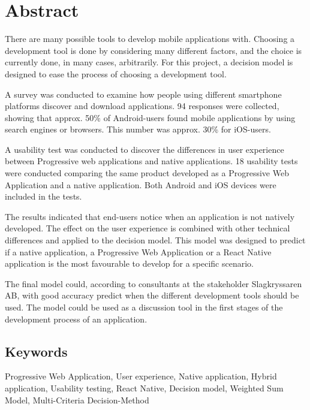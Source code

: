 \newpage

\section*{Abstract}
There are many possible tools to develop mobile applications with. Choosing a development tool is done by considering many different factors, and the choice is currently done, in many cases, arbitrarily. For this project, a decision model is designed to ease the process of choosing a development tool.

A survey was conducted to examine how people using different smartphone platforms discover and download applications. 94 responses were collected, showing that approx. 50\% of Android-users found mobile applications by using search engines or browsers. This number was approx. 30\% for iOS-users.

A usability test was conducted to discover the differences in user experience between Progressive web applications and native applications. 18 usability tests were conducted comparing the same product developed as a Progressive Web Application and a native application. Both Android and iOS devices were included in the tests.

The results indicated that end-users notice when an application is not natively developed. The effect on the user experience is combined with other technical differences and applied to the decision model. This model was designed to predict if a native application, a Progressive Web Application or a React Native application is the most favourable to develop for a specific scenario.

The final model could, according to consultants at the stakeholder Slagkryssaren AB, with good accuracy predict when the different development tools should be used. The model could be used as a discussion tool in the first stages of the development process of an application. 

\subsection*{Keywords}
Progressive Web Application, User experience, Native application, Hybrid application, Usability testing, React Native, Decision model, Weighted Sum Model, Multi-Criteria Decision-Method






